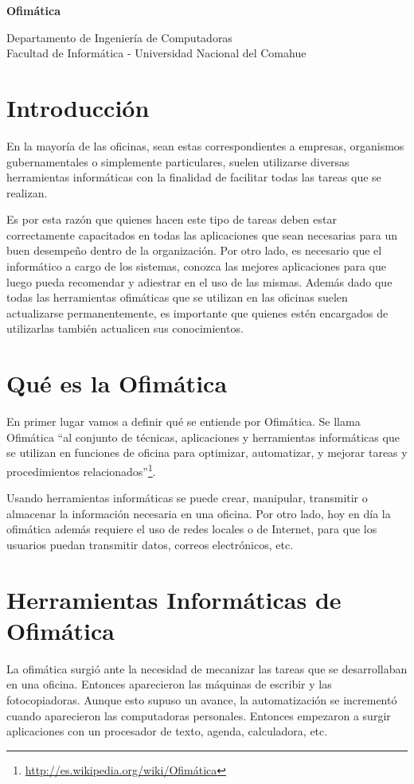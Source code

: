 \documentclass[12pt]{article}
\def\maketitle{

\makeatletter
{\color{bl} \centering \huge \sc \textbf{
Ofimática\\
 \vspace*{8pt} }\par}
 \makeatother


 \makeatletter
 {\centering \small 
 	Departamento de Ingeniería de Computadoras \\
 	Facultad de Informática - Universidad Nacional del Comahue \\
 	\vspace{20pt} }
 \makeatother

}
\begin{document}
\thispagestyle{empty}
\maketitle
\setlength{\parindent}{0pt}


\section{Introducción}

En la mayoría de las oficinas, sean estas correspondientes a empresas, organismos gubernamentales o simplemente particulares, suelen utilizarse diversas herramientas informáticas con la finalidad de facilitar todas las tareas que se realizan.

Es por esta razón que quienes hacen este tipo de tareas deben estar correctamente capacitados en todas las aplicaciones que sean necesarias para un buen desempeño dentro de la organización. Por otro lado, es necesario que el informático a cargo de los sistemas, conozca las mejores aplicaciones para que luego pueda recomendar y adiestrar en el uso de las mismas. Además dado que todas las herramientas ofimáticas que se utilizan en las oficinas suelen actualizarse permanentemente, es importante que quienes estén encargados de utilizarlas también actualicen sus conocimientos.


\section{Qué es la Ofimática}

En primer lugar vamos a definir qué se entiende por Ofimática. Se llama Ofimática “al conjunto de técnicas, aplicaciones y herramientas informáticas que se utilizan en funciones de oficina para optimizar, automatizar, y mejorar tareas y procedimientos relacionados”\footnote{\url{http://es.wikipedia.org/wiki/Ofimática}}.

Usando herramientas informáticas se puede crear, manipular, transmitir o almacenar la información necesaria en una oficina. Por otro lado, hoy en día la ofimática además requiere el uso de redes locales o de Internet, para que los usuarios puedan transmitir datos, correos electrónicos, etc.

\section{Herramientas Informáticas de Ofimática}

La ofimática surgió ante la necesidad de mecanizar las tareas que se desarrollaban en una oficina. Entonces aparecieron las máquinas de escribir y las fotocopiadoras. Aunque esto supuso un avance, la automatización se incrementó cuando aparecieron las computadoras personales. Entonces empezaron a surgir aplicaciones con un procesador de texto, agenda, calculadora, etc. 
\end{document}
